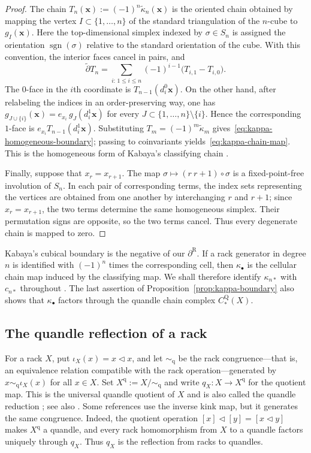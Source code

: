 \documentclass[11pt]{article}
\DeclareMathOperator{\sgn}{sgn}
\newcommand{\td}{\widetilde\partial}
\newcommand{\R}{\mathrm R}
\newcommand{\Q}{\mathrm Q}
\begin{document}
\begin{proof}
The chain $T_n(\mathbf x):=(-1)^n\widetilde\kappa_n(\mathbf x)$ is the oriented chain obtained by mapping the vertex $I\subset\{1,\ldots,n\}$ of the standard triangulation of the $n$-cube to $g_I(\mathbf x)$. Here the top-dimensional simplex indexed by $\sigma\in S_n$ is assigned the orientation $\sgn(\sigma)$ relative to the standard orientation of the cube. With this convention, the interior faces cancel in pairs, and
\[
 \td T_n=\sum_{i:\,1\le i\le n}(-1)^{i-1}\bigl(T_{i,1}-T_{i,0}\bigr).
\]
The $0$-face in the $i$th coordinate is $T_{n-1}(d_i^0\mathbf x)$. On the other hand, after relabeling the indices in an order-preserving way, one has $g_{J\cup\{i\}}(\mathbf x)=e_{x_i}\,g_J(d_i^1\mathbf x)$ for every $J\subset\{1,\ldots,n\}\setminus\{i\}$. Hence the corresponding $1$-face is $e_{x_i}T_{n-1}(d_i^1\mathbf x)$. Substituting $T_m=(-1)^m\widetilde\kappa_m$ gives~\eqref{eq:kappa-homogeneous-boundary}; passing to coinvariants yields~\eqref{eq:kappa-chain-map}. This is the homogeneous form of Kabaya's classifying chain \cite[\S8.4]{Kabaya}.

Finally, suppose that $x_r=x_{r+1}$. The map
$\sigma\mapsto(r\ r+1)\circ\sigma$ is a fixed-point-free involution of $S_n$. In each pair of corresponding terms, the index sets representing the vertices are obtained from one another by interchanging $r$ and $r+1$; since $x_r=x_{r+1}$, the two terms determine the same homogeneous simplex. Their permutation signs are opposite, so the two terms cancel. Thus every degenerate chain is mapped to zero.
\end{proof}

Kabaya's cubical boundary is the negative of our $\partial^\R$. If a rack generator in degree $n$ is identified with $(-1)^n$ times the corresponding cell, then $\kappa_\bullet$ is the cellular chain map induced by the classifying map. We shall therefore identify $\kappa_{n*}$ with $c_{n*}$ throughout \cite[\S8.4]{Kabaya}. The last assertion of Proposition~\ref{prop:kappa-boundary} also shows that $\kappa_\bullet$ factors through the quandle chain complex $C_*^\Q(X)$.

\subsection{The quandle reflection of a rack}
\label{subsec:quandle-reflection}

For a rack $X$, put $\iota_X(x)=x\lhd x$, and let $\sim_{\mathrm q}$ be the rack congruence---that is, an equivalence relation compatible with the rack operation---generated by
$x\sim_{\mathrm q}\iota_X(x)$ for all $x\in X$. Set $X^{\mathrm q}:=X/{\sim_{\mathrm q}}$ and write $q_X\colon X\to X^{\mathrm q}$ for the quotient map. This is the universal quandle quotient of $X$ and is also called the quandle reduction
\cite{FennRourke}; see also \cite[Proposition~5.1]{TanakaTaniguchi}. Some references use the inverse kink map, but it generates the same congruence. Indeed, the quotient operation $[x]\lhd[y]=[x\lhd y]$ makes $X^{\mathrm q}$ a quandle, and every rack homomorphism from $X$ to a quandle factors uniquely through $q_X$. Thus $q_X$ is the reflection from racks to quandles.
\end{document}
